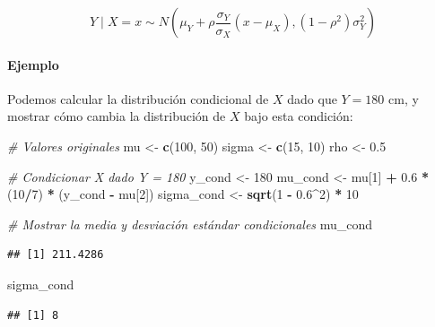 \documentclass[
]{article}
\newenvironment{Shaded}{\begin{snugshade}}{\end{snugshade}}
\newcommand{\CommentTok}[1]{\textcolor[rgb]{0.56,0.35,0.01}{\textit{#1}}}
\newcommand{\DecValTok}[1]{\textcolor[rgb]{0.00,0.00,0.81}{#1}}
\newcommand{\FloatTok}[1]{\textcolor[rgb]{0.00,0.00,0.81}{#1}}
\newcommand{\FunctionTok}[1]{\textcolor[rgb]{0.13,0.29,0.53}{\textbf{#1}}}
\newcommand{\NormalTok}[1]{#1}
\newcommand{\OtherTok}[1]{\textcolor[rgb]{0.56,0.35,0.01}{#1}}
\newcommand{\SpecialCharTok}[1]{\textcolor[rgb]{0.81,0.36,0.00}{\textbf{#1}}}
\begin{document}
\[
Y \mid X = x \sim N \left( \mu_Y + \rho \frac{\sigma_Y}{\sigma_X} (x - \mu_X), (1 - \rho^2)\sigma_Y^2 \right)
\]

\paragraph{Ejemplo}\label{ejemplo-2}

Podemos calcular la distribución condicional de \(X\) dado que \(Y = 180\) cm, y mostrar cómo cambia la distribución de \(X\) bajo esta condición:

\begin{Shaded}
\begin{Highlighting}[]
\CommentTok{\# Valores originales}
\NormalTok{mu }\OtherTok{\textless{}{-}} \FunctionTok{c}\NormalTok{(}\DecValTok{100}\NormalTok{, }\DecValTok{50}\NormalTok{)}
\NormalTok{sigma }\OtherTok{\textless{}{-}} \FunctionTok{c}\NormalTok{(}\DecValTok{15}\NormalTok{, }\DecValTok{10}\NormalTok{)}
\NormalTok{rho }\OtherTok{\textless{}{-}} \FloatTok{0.5}

\CommentTok{\# Condicionar X dado Y = 180}
\NormalTok{y\_cond }\OtherTok{\textless{}{-}} \DecValTok{180}
\NormalTok{mu\_cond }\OtherTok{\textless{}{-}}\NormalTok{ mu[}\DecValTok{1}\NormalTok{] }\SpecialCharTok{+} \FloatTok{0.6} \SpecialCharTok{*}\NormalTok{ (}\DecValTok{10}\SpecialCharTok{/}\DecValTok{7}\NormalTok{) }\SpecialCharTok{*}\NormalTok{ (y\_cond }\SpecialCharTok{{-}}\NormalTok{ mu[}\DecValTok{2}\NormalTok{])}
\NormalTok{sigma\_cond }\OtherTok{\textless{}{-}} \FunctionTok{sqrt}\NormalTok{(}\DecValTok{1} \SpecialCharTok{{-}} \FloatTok{0.6}\SpecialCharTok{\^{}}\DecValTok{2}\NormalTok{) }\SpecialCharTok{*} \DecValTok{10}

\CommentTok{\# Mostrar la media y desviación estándar condicionales}
\NormalTok{mu\_cond}
\end{Highlighting}
\end{Shaded}

\begin{verbatim}
## [1] 211.4286
\end{verbatim}

\begin{Shaded}
\begin{Highlighting}[]
\NormalTok{sigma\_cond}
\end{Highlighting}
\end{Shaded}

\begin{verbatim}
## [1] 8
\end{verbatim}
\end{document}
